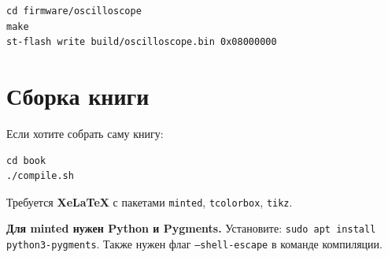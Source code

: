 \begin{verbatim}
cd firmware/oscilloscope
make
st-flash write build/oscilloscope.bin 0x08000000
\end{verbatim}

\section{Сборка книги}

Если хотите собрать саму книгу:

\begin{verbatim}
cd book
./compile.sh
\end{verbatim}

Требуется \textbf{XeLaTeX} с пакетами \texttt{minted}, \texttt{tcolorbox},
\texttt{tikz}.

\begin{notebox}
\textbf{Для minted нужен Python и Pygments.}
Установите: \texttt{sudo apt install python3-pygments}.
Также нужен флаг \texttt{--shell-escape} в команде компиляции.
\end{notebox}


